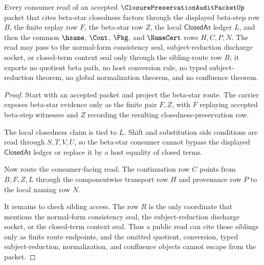 \begin{theorem}
\label{thm:closure-preservation-audit-packet-beta-star-boundary}
Every consumer read of an accepted $\ClosurePreservationAuditPacketUp$ packet that cites beta-star closedness factors through the displayed beta-step row $B$, the finite replay row $F$, the beta-star row $Z$, the local $\mathsf{ClosedAt}$ ledger $L$, and then the common $\hsame$, $\Cont$, $\Pkg$, and $\NameCert$ rows $H,C,P,N$. The read may pass to the normal-form consistency seal, subject-reduction discharge socket, or closed-term context seal only through the sibling-route row $R$; it exports no quotient beta path, no host conversion rule, no typed subject-reduction theorem, no global normalization theorem, and no confluence theorem.
\end{theorem}
\begin{proof}
Start with an accepted packet and project the beta-star route. The carrier exposes beta-star evidence only as the finite pair $F,Z$, with $F$ replaying accepted beta-step witnesses and $Z$ recording the resulting closedness-preservation row.

The local closedness claim is tied to $L$. Shift and substitution side conditions are read through $S,T,V,U$, so the beta-star consumer cannot bypass the displayed $\mathsf{ClosedAt}$ ledger or replace it by a host equality of closed terms.

Now route the consumer-facing read. The continuation row $C$ points from $B,F,Z,L$ through the componentwise transport row $H$ and provenance row $P$ to the local naming row $N$.

It remains to check sibling access. The row $R$ is the only coordinate that mentions the normal-form consistency seal, the subject-reduction discharge socket, or the closed-term context seal. Thus a public read can cite those siblings only as finite route endpoints, and the omitted quotient, conversion, typed subject-reduction, normalization, and confluence objects cannot escape from the packet.
\end{proof}


